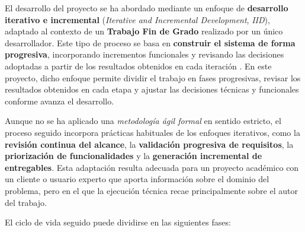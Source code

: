 El desarrollo del proyecto se ha abordado mediante un enfoque de \textbf{desarrollo iterativo e incremental} (\textit{Iterative and Incremental Development}, \textit{IID}), adaptado al contexto de un \textbf{Trabajo Fin de Grado} realizado por un único desarrollador. Este tipo de proceso se basa en \textbf{construir el sistema de forma progresiva}, incorporando incrementos funcionales y revisando las decisiones adoptadas a partir de los resultados obtenidos en cada iteración \citep{larman2003iid}. En este proyecto, dicho enfoque permite dividir el trabajo en fases progresivas, revisar los resultados obtenidos en cada etapa y ajustar las decisiones técnicas y funcionales conforme avanza el desarrollo.

Aunque no se ha aplicado una \textit{metodología ágil formal} en sentido estricto, el proceso seguido incorpora prácticas habituales de los enfoques iterativos, como la \textbf{revisión continua del alcance}, la \textbf{validación progresiva de requisitos}, la \textbf{priorización de funcionalidades} y la \textbf{generación incremental de entregables}. Esta adaptación resulta adecuada para un proyecto académico con un cliente o usuario experto que aporta información sobre el dominio del problema, pero en el que la ejecución técnica recae principalmente sobre el autor del trabajo.

El ciclo de vida seguido puede dividirse en las siguientes fases:

